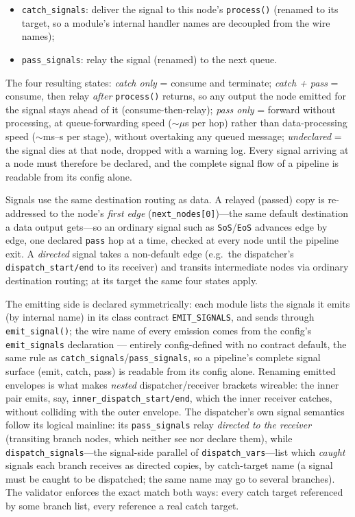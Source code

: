 \documentclass[11pt,a4paper]{article}
\begin{document}
\begin{itemize}
    \item \texttt{catch\_signals}: deliver the signal to this node's \texttt{process()} (renamed to its target, so a module's internal handler names are decoupled from the wire names);
    \item \texttt{pass\_signals}: relay the signal (renamed) to the next queue.
\end{itemize}

The four resulting states: \emph{catch only} = consume and terminate; \emph{catch + pass} = consume, then relay \emph{after} \texttt{process()} returns, so any output the node emitted for the signal stays ahead of it (consume-then-relay); \emph{pass only} = forward without processing, at queue-forwarding speed ($\sim$$\mu$s per hop) rather than data-processing speed ($\sim$ms--s per stage), without overtaking any queued message; \emph{undeclared} = the signal dies at that node, dropped with a warning log. Every signal arriving at a node must therefore be declared, and the complete signal flow of a pipeline is readable from its config alone.

Signals use the same destination routing as data. A relayed (passed) copy is re-addressed to the node's \emph{first edge} (\texttt{next\_nodes[0]})---the same default destination a data output gets---so an ordinary signal such as \texttt{SoS}/\texttt{EoS} advances edge by edge, one declared \texttt{pass} hop at a time, checked at every node until the pipeline exit. A \emph{directed} signal takes a non-default edge (e.g.\ the dispatcher's \texttt{dispatch\_start/end} to its receiver) and transits intermediate nodes via ordinary destination routing; at its target the same four states apply.

The emitting side is declared symmetrically: each module lists the signals it emits (by internal name) in its class contract \texttt{EMIT\_SIGNALS}, and sends through \texttt{emit\_signal()}; the wire name of every emission comes from the config's \texttt{emit\_signals} declaration --- entirely config-defined with no contract default, the same rule as \texttt{catch\_signals}/\texttt{pass\_signals}, so a pipeline's complete signal surface (emit, catch, pass) is readable from its config alone. Renaming emitted envelopes is what makes \emph{nested} dispatcher/receiver brackets wireable: the inner pair emits, say, \texttt{inner\_dispatch\_start/end}, which the inner receiver catches, without colliding with the outer envelope. The dispatcher's own signal semantics follow its logical mainline: its \texttt{pass\_signals} relay \emph{directed to the receiver} (transiting branch nodes, which neither see nor declare them), while \texttt{dispatch\_signals}---the signal-side parallel of \texttt{dispatch\_vars}---list which \emph{caught} signals each branch receives as directed copies, by catch-target name (a signal must be caught to be dispatched; the same name may go to several branches). The validator enforces the exact match both ways: every catch target referenced by some branch list, every reference a real catch target.
\end{document}
